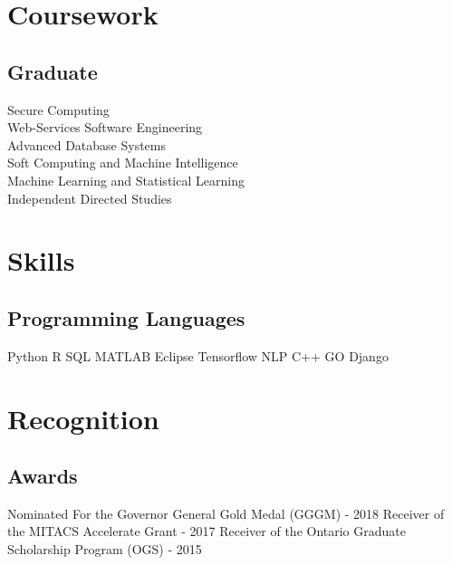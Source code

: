 \documentclass[]{deedy-resume-openfont}
\begin{document}
\begin{minipage}[t]{0.33\textwidth}

\section{Coursework}
\subsection{Graduate}
Secure Computing\\
Web-Services Software Engineering\\
Advanced Database Systems \\
Soft Computing and Machine Intelligence \\
Machine Learning and Statistical Learning \\
Independent Directed Studies
\sectionsep


\section{Skills}
\subsection{Programming Languages}
\textbullet{} Python \textbullet{} R \textbullet{} SQL \textbullet{}  MATLAB
\bigbreak
{}
\textbullet{} Eclipse \textbullet{} Tensorflow \textbullet{} NLP
\bigbreak
{}
\textbullet{} C++ \textbullet{} GO \textbullet{} Django
\section{Recognition}
\subsection{Awards}
\textbullet{} Nominated For the Governor General Gold Medal (GGGM) - 2018
\bigbreak
\textbullet{} Receiver of the MITACS Accelerate Grant - 2017
\bigbreak
\textbullet{} Receiver of the Ontario Graduate Scholarship Program (OGS) - 2015
%
%

\end{minipage} 
\hfill
\end{document}
